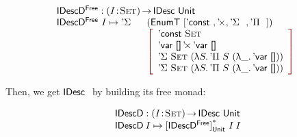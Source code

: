 \[\stk{
\IDescFreeD : \PI{\V{I}}{\Set} \IDesc{\Unit} \\
\begin{array}{@{}ll}
\IDescFreeD~I \mapsto \DSigma{}{} & (\EnumT \red{[} \DConst{},
                                              \DProd{}{},
                                              \DSigma{}{}, 
                                              \DPi{}{} \red{]}) \\
                                  & \bigRedBracket{\begin{array}{l}
                                        \DConst{\Set}               \\
                                        \DProd{\DVar{\Void}}{\DVar{\Void}}  \\
                                        \DSigma{\Set}{(\LAM{S} \DPi{S}{(\LAM{\_} \DVar{\Void})})} \\
                                        \DSigma{\Set}{(\LAM{S} \DPi{S}{(\LAM{\_} \DVar{\Void})})}
                                    \end{array}}
\end{array}
}\]

Then, we get $\IDesc$ by building its free monad:

\[\stk{
\IDescD : \PI{\V{I}}{\Set} \IDesc{\Unit} \\
\IDescD\: I \mapsto \FreeIMonad{\red{[}\IDescFreeD\red{]}}{\Unit}{I}\: I
}\]


